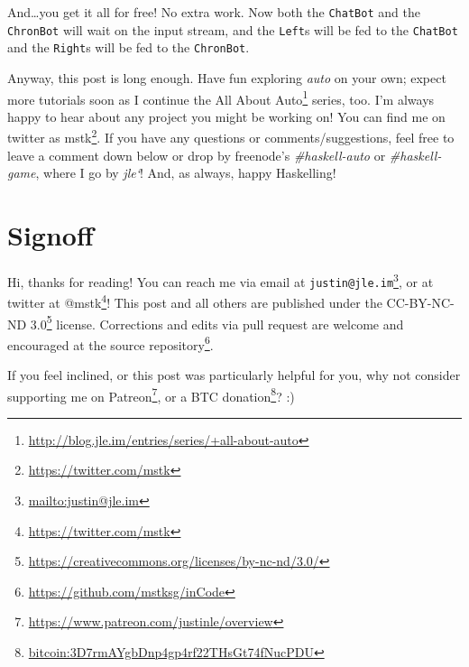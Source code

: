 \documentclass[]{article}
\renewcommand{\href}[2]{#2\footnote{\url{#1}}}
\begin{document}
And\ldots you get it all for free! No extra work. Now both the \texttt{ChatBot}
and the \texttt{ChronBot} will wait on the input stream, and the \texttt{Left}s
will be fed to the \texttt{ChatBot} and the \texttt{Right}s will be fed to the
\texttt{ChronBot}.

Anyway, this post is long enough. Have fun exploring \emph{auto} on your own;
expect more tutorials soon as I continue the
\href{http://blog.jle.im/entries/series/+all-about-auto}{All About Auto} series,
too. I'm always happy to hear about any project you might be working on! You can
find me on twitter as \href{https://twitter.com/mstk}{mstk}. If you have any
questions or comments/suggestions, feel free to leave a comment down below or
drop by freenode's \emph{\#haskell-auto} or \emph{\#haskell-game}, where I go by
\emph{jle`}! And, as always, happy Haskelling!

\hypertarget{signoff}{%
\section{Signoff}\label{signoff}}

Hi, thanks for reading! You can reach me via email at
\href{mailto:justin@jle.im}{\nolinkurl{justin@jle.im}}, or at twitter at
\href{https://twitter.com/mstk}{@mstk}! This post and all others are published
under the \href{https://creativecommons.org/licenses/by-nc-nd/3.0/}{CC-BY-NC-ND
3.0} license. Corrections and edits via pull request are welcome and encouraged
at \href{https://github.com/mstksg/inCode}{the source repository}.

If you feel inclined, or this post was particularly helpful for you, why not
consider \href{https://www.patreon.com/justinle/overview}{supporting me on
Patreon}, or a \href{bitcoin:3D7rmAYgbDnp4gp4rf22THsGt74fNucPDU}{BTC donation}?
:)
\end{document}
